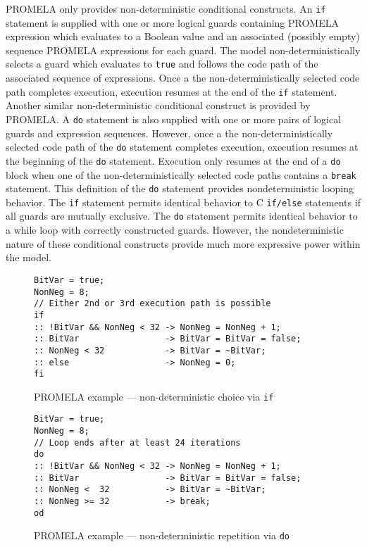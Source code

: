 PROMELA only provides non-deterministic conditional constructs.
An \texttt{if} statement is supplied with one or more logical guards containing PROMELA expression which evaluates to a Boolean value and an associated (possibly empty) sequence PROMELA expressions for each guard.
The model non-deterministically selects a guard which evaluates to \texttt{true} and follows the code path of the associated sequence of expressions.
Once a the non-deterministically selected code path completes execution, execution resumes at the end of the \texttt{if} statement.
Another similar non-deterministic conditional construct is provided by PROMELA.
A \texttt{do} statement is also supplied with one or more pairs of logical guards and expression sequences.
However, once a the non-deterministically selected code path of the \texttt{do} statement completes execution, execution resumes at the beginning of the \texttt{do} statement.
Execution only resumes at the end of a \texttt{do} block when one of the non-deterministically selected code paths contains a \texttt{break} statement.
This definition of the \texttt{do} statement provides nondeterministic looping behavior.
The \texttt{if} statement permits identical behavior to C \texttt{if/else} statements if all guards are mutually exclusive.
The \texttt{do} statement permits identical behavior to a while loop with correctly constructed guards.
However, the nondeterministic nature of these conditional constructs provide much more expressive power within the model.

\begin{figure}
\centering
\caption{PROMELA example --- non-deterministic choice via \texttt{if}}
\begin{verbatim}
BitVar = true;
NonNeg = 8;
// Either 2nd or 3rd execution path is possible
if
:: !BitVar && NonNeg < 32 -> NonNeg = NonNeg + 1;
:: BitVar                 -> BitVar = BitVar = false;
:: NonNeg < 32            -> BitVar = ~BitVar;
:: else                   -> NonNeg = 0;
fi
\end{verbatim}
\end{figure}


\begin{figure}
\centering
\caption{PROMELA example --- non-deterministic repetition via \texttt{do}}
\begin{verbatim}
BitVar = true;
NonNeg = 8;
// Loop ends after at least 24 iterations
do
:: !BitVar && NonNeg < 32 -> NonNeg = NonNeg + 1;
:: BitVar                 -> BitVar = BitVar = false;
:: NonNeg <  32           -> BitVar = ~BitVar;
:: NonNeg >= 32           -> break;
od
\end{verbatim}
\end{figure}

